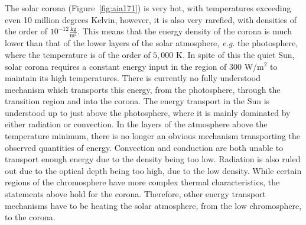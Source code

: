 The solar corona (Figure~\ref{fig:aia171}) is very hot, with temperatures exceeding even 10 million degrees Kelvin, however, it is also very rarefied, with densities of the order of $10^{-12}$$\frac{\text{kg}}{\text{m}^3}$.
This means that the energy density of the corona is much lower than that of the lower layers of the solar atmosphere, \textit{e.g.} the photosphere, where the temperature is of the order of $5,000$ K.
In spite of this the quiet Sun, solar corona requires a constant energy input in the region of $300$ W/m$^2$ \citep{priest2014} to maintain its high temperatures.
There is currently no fully understood mechanism which transports this energy, from the photosphere, through the transition region and into the corona. \citep{aschwanden2007,erdelyi2007,parnell2012}
The energy transport in the Sun is understood up to just above the photosphere, where it is mainly dominated by either radiation or convection.
In the layers of the atmosphere above the temperature minimum, there is no longer an obvious mechanism transporting the observed quantities of energy.
Convection and conduction are both unable to transport enough energy due to the density being too low.
Radiation is also ruled out due to the optical depth being too high, due to the low density.
While certain regions of the chromosphere have more complex thermal characteristics, the statements above hold for the corona.
Therefore, other energy transport mechanisms have to be heating the solar atmosphere, from the low chromosphere, to the corona.



